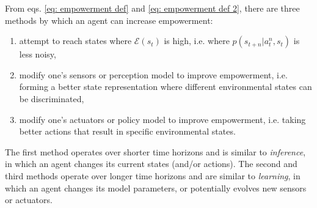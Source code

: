 From eqs. \ref{eq: empowerment def} and \ref{eq: empowerment def 2}, there are three methods by which an agent can increase empowerment:
\begin{enumerate}
    \item attempt to reach states where $\mathcal{E} (s_t)$ is high, i.e. where $p(s_{t+n} | a^n_t, s_t)$ is less noisy,
    \item modify one's sensors or perception model to improve empowerment, i.e. forming a better state representation where different environmental states can be discriminated,
    \item modify one's actuators or policy model to improve empowerment, i.e. taking better actions that result in specific environmental states.
\end{enumerate}
\noindent The first method operates over shorter time horizons and is similar to \textit{inference}, in which an agent changes its current states (and/or actions). The second and third methods operate over longer time horizons and are similar to \textit{learning}, in which an agent changes its model parameters, or potentially evolves new sensors or actuators.

